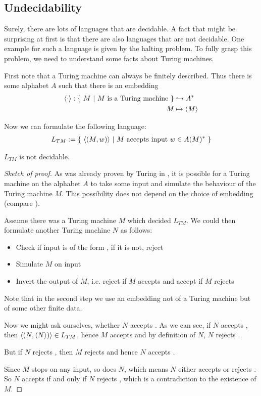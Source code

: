 \subsection{Undecidability}

Surely, there are lots of languages that are decidable.
A fact that might be surprising at first is that there are also languages that are not decidable.
One example for such a language is given by the halting problem.
To fully grasp this problem, we need to understand some facts about Turing machines.

First note that a Turing machine can always be finitely described. Thus there is some alphabet $A$ such that there is an embedding
\begin{align*}
	\langle \cdot \rangle : \{~M~|~M~\text{is a Turing machine}~\} &\hookrightarrow A^* \\
	M &\mapsto \langle M \rangle
\end{align*}

Now we can formulate the following language:
\begin{align*}
	L_{TM} := \{~\langle (M,w) \rangle~|~M~\text{accepts input}~w \in A(M)^*~\}
\end{align*}

\begin{Theorem}
	$L_{TM}$ is not decidable.
\end{Theorem}
\begin{proof}[Sketch of proof]
	As was already proven by Turing in \cite{tur36}, it is possible for a Turing machine on the alphabet $A$ to take some input  and simulate the behaviour of the Turing machine $M$.
	This possibility does not depend on the choice of embedding (compare \cite{sip06}).

	Assume there was a Turing machine $M$ which decided $L_{TM}$.
	We could then formulate another Turing machine $N$ as follows:
	\begin{itemize}
		\item Check if input is of the form , if it is not, reject
		\item Simulate $M$ on input 
		\item Invert the output of $M$, i.e. reject if $M$ accepts and accept if $M$ rejects
	\end{itemize}
	Note that in the second step we use an embedding not of a Turing machine but of some other finite data.

	Now we might ask ourselves, whether $N$ accepts .
	As we can see, if $N$ accepts , then $\langle (N,\langle N \rangle) \rangle \in L_{TM}$, hence $M$ accepts  and by definition of $N$, $N$ rejects .
	
	But if $N$ rejects , then $M$ rejects  and hence $N$ accepts .

	Since $M$ stops on any input, so does $N$, which means $N$ either accepts or rejects .
	So $N$ accepts  if and only if $N$ rejects , which is a contradiction to the existence of $M$.
\end{proof}

